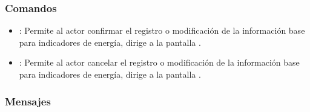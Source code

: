 \subsubsection{Comandos}
    \begin{itemize}
	\item {}: Permite al actor confirmar el registro o modificación de la información base para indicadores de energía, dirige a la pantalla .
	\item {}: Permite al actor cancelar el registro o modificación de la información base para indicadores de energía, dirige a la pantalla .
    \end{itemize}

\subsubsection{Mensajes}

